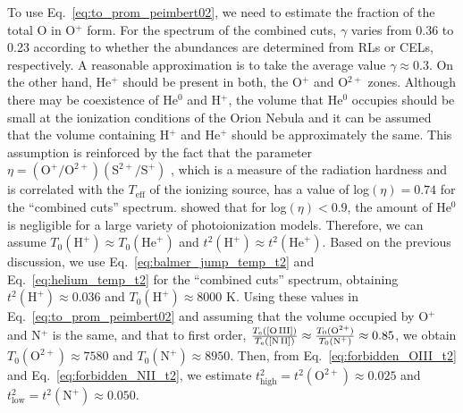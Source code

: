 \documentclass[fleqn,usenatbib]{mnras}
\begin{document}
To use Eq.~\eqref{eq:to_prom_peimbert02}, we need to estimate the fraction of the total O in O$^+$ form. For the spectrum of the combined cuts, $\gamma$ varies from 0.36 to 0.23 according to whether the abundances are determined from RLs or CELs, respectively. A reasonable approximation is to take the average value $\gamma \approx 0.3$. 
On the other hand, He$^+$ should be present in both, the O$^+$ and O$^{2+}$ zones. Although there may be coexistence of He$^0$ and H$^+$, the volume that He$^0$ occupies should be small at the ionization conditions of the Orion Nebula and it can be assumed that the volume containing H$^+$ and He$^+$ should be approximately the same.  This assumption is reinforced by the fact that the parameter $\eta=(\text{O}^{+}/\text{O}^{2+})(\text{S}^{2+}/\text{S}^{+})$ \citep{Vilchez88}, which is a measure of the radiation hardness and is correlated with the $T_{\text{eff}}$ of the ionizing source, has a value of log$\left(\eta\right)=0.74$ for the ``combined cuts'' spectrum. \citet{pagel92} showed that for log$\left(\eta\right)<0.9$, the amount of He$^{0}$ is negligible for a large
variety of photoionization models. Therefore, we can assume $T_0(\text{H}^{+})\approx T_0(\text{He}^{+})$ and $t^2 (\text{H}^{+})\approx t^2(\text{He}^{+})$. 
Based on the previous discussion, we use Eq.~\eqref{eq:balmer_jump_temp_t2} and Eq.~\eqref{eq:helium_temp_t2} for the ``combined cuts'' spectrum, obtaining $t^2(\text{H}^{+})\approx 0.036$ and $T_0(\text{H}^{+}) \approx 8000 \text{ K}$. Using these values in Eq.~\eqref{eq:to_prom_peimbert02} and assuming that the volume occupied by O$^{+}$ and N$^{+}$ is the same, and that to first order, $ \frac{ T_{\rm e}(\text{[O\thinspace III]})}{ T_{\rm e}(\text{[N\thinspace II]})} \approx \frac{ T_0(\text{O}^{2+})}{T_0(\text{N}^{+})}
\approx 0.85$, we obtain $T_0(\text{O}^{2+})\approx 7580$ and  $T_0(\text{N}^{+})\approx 8950$. Then, from Eq.~\eqref{eq:forbidden_OIII_t2} and Eq.~\eqref{eq:forbidden_NII_t2}, we estimate $t^2_{\text{high}}=t^{2}(\text{O}^{2+})\approx0.025$ and $t^2_{\text{low}}=t^{2}(\text{N}^{+})\approx0.050$. 
\end{document}
